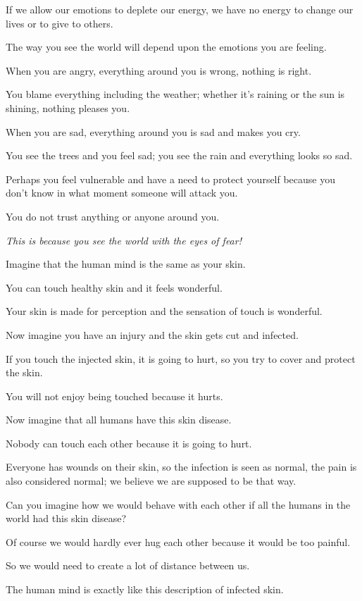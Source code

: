 \documentclass{article}
\numberwithin{equation}{section}
\begin{document}
If we allow our emotions to deplete our energy, we have no energy to change our lives or to give to others.

%
The way you see the world will depend upon the emotions you are feeling.

When you are angry, everything around you is wrong, nothing is right.

You blame everything including the weather; whether it's raining or the sun is shining, nothing pleases you.

When you are sad, everything around you is sad and makes you cry.

You see the trees and you feel sad; you see the rain and everything looks so sad.

Perhaps you feel vulnerable and have a need to protect yourself because you don't know in what moment someone will attack you.

You do not trust anything or anyone around you.

\textit{This is because you see the world with the eyes of fear!}

%
Imagine that the human mind is the same as your skin.

You can touch healthy skin and it feels wonderful.

Your skin is made for perception and the sensation of touch is wonderful.

Now imagine you have an injury and the skin gets cut and infected.

If you touch the injected skin, it is going to hurt, so you try to cover and protect the skin.

You will not enjoy being touched because it hurts.

%
Now imagine that all humans have this skin disease.

Nobody can touch each other because it is going to hurt.

Everyone has wounds on their skin, so the infection is seen as normal, the pain is also considered normal; we believe we are supposed to be that way.

%
Can you imagine how we would behave with each other if all the humans in the world had this skin disease?

Of course we would hardly ever hug each other because it would be too painful.

So we would need to create a lot of distance between us.

%
The human mind is exactly like this description of infected skin.
\end{document}
